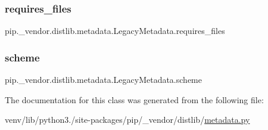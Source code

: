 \subsubsection{\texorpdfstring{requires\+\_\+files}{requires\_files}}
{\footnotesize\ttfamily pip.\+\_\+vendor.\+distlib.\+metadata.\+Legacy\+Metadata.\+requires\+\_\+files}

\mbox{\label{classpip_1_1__vendor_1_1distlib_1_1metadata_1_1LegacyMetadata_ab3f060c78a87e7f63c7d3dc1dcc1857e}} 
\subsubsection{\texorpdfstring{scheme}{scheme}}
{\footnotesize\ttfamily pip.\+\_\+vendor.\+distlib.\+metadata.\+Legacy\+Metadata.\+scheme}



The documentation for this class was generated from the following file\+:\begin{DoxyCompactItemize}
\item 
venv/lib/python3./site-\/packages/pip/\+\_\+vendor/distlib/\hyperlink{pip_2__vendor_2distlib_2metadata_8py}{metadata.\+py}\end{DoxyCompactItemize}
